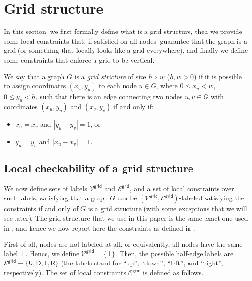 \documentclass[11pt]{article}
\newcommand{\lleft}{\mathsf {L}}
\newcommand{\lright}{\mathsf {R}}
\newcommand{\lup}{\mathsf {U}}
\newcommand{\ldown}{\mathsf {D}}
\newcommand{\lgrid}{\mathsf {grid}}
\begin{document}
\section{Grid structure}\label{sec:grid}
In this section, we first formally define what is a grid structure, then we provide some local constraints that, if satisfied on all nodes, guarantee that the graph is a grid (or something that locally looks like a grid everywhere), and finally we define some constraints that enforce a grid to be vertical.

\begin{definition}
	We say that a graph $G$ is a \emph{grid stricture} of size $h\times w$ ($h,w>0$) if it is possible to assign coordinates $(x_u, y_u)$ to each node $u\in G$, where $0\le x_u < w$, $0 \le y_u < h$, such that there is an edge connecting two nodes $u,v\in G$ with coordinates $(x_u, y_u)$ and $(x_v, y_v)$ if and only if:
	\begin{itemize}[noitemsep]
		\item $x_u = x_v$ and $|y_u - y_v| = 1$, or
		\item $y_u = y_v$ and $|x_u - x_v| = 1$.
	\end{itemize} 
\end{definition}


\subsection{Local checkability of a grid structure}
We now define sets of labels $\mathcal{V^\lgrid}$ and $\mathcal{E^\lgrid}$, and a set of local constraints over such labels, satisfying that a graph $G$ can be $(\mathcal{V^\lgrid},\mathcal{E^\lgrid})$-labeled satisfying the constraints if and only of $G$ is a grid structure (with some exceptions that we will see later).
The grid structure that we use in this paper is the same exact one used in \cite{congest-lcls}, and hence we now report here the constraints as defined in \cite{congest-lcls}.

First of all, nodes are not labeled at all, or equivalently, all nodes have the same label $\bot$. Hence, we define $\mathcal{V^\lgrid} = \{\bot\}$. Then, the possible half-edge labels are $\mathcal{E^\lgrid} = \{\lup,\ldown, \lleft, \lright\}$ (the labels stand for ``up'', ``down'', ``left'', and ``right'', respectively). 
The set of local constraints $\mathcal{C}^{\lgrid}$ is defined as follows.
\end{document}
